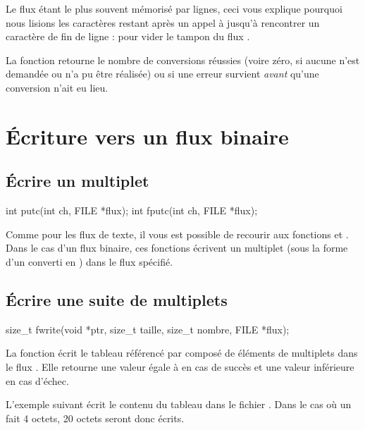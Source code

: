 \begin{infobox} 
 Le flux  étant le plus
souvent mémorisé par lignes, ceci vous explique pourquoi nous lisions
les caractères restant après un appel à  jusqu'à
rencontrer un caractère de fin de ligne : pour vider le tampon du flux
.
\end{infobox}


La fonction  retourne le nombre de conversions réussies
(voire zéro, si aucune n'est demandée ou n'a pu être réalisée) ou
 si une erreur survient \emph{avant} qu'une conversion n'ait
eu lieu.

\section{Écriture vers un flux binaire}
\label{ecriture-vers-un-flux-binaire}

\subsection{Écrire un multiplet}
\label{ecrire-un-multiplet}

\begin{C}
int putc(int ch, FILE *flux);
int fputc(int ch, FILE *flux);
\end{C}

Comme pour les flux de texte, il vous est possible de recourir aux
fonctions  et . Dans le cas d'un flux
binaire, ces fonctions écrivent un multiplet (sous la forme d'un
 converti en ) dans le flux spécifié.

\subsection{Écrire une suite de multiplets}
\label{ecrire-une-suite-de-multiplets}

\begin{C}
size_t fwrite(void *ptr, size_t taille, size_t nombre, FILE *flux);
\end{C}

La fonction  écrit le tableau référencé par
 composé de  éléments de 
multiplets dans le flux . Elle retourne une valeur égale à
 en cas de succès et une valeur inférieure en cas
d'échec.

L'exemple suivant écrit le contenu du tableau  dans le
fichier . Dans le cas où un  fait 4
octets, 20 octets seront donc écrits.

